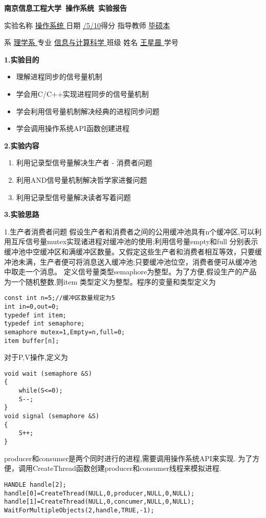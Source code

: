 \documentclass[UTF8,a4paper]{ctexart}
\begin{document}
\pagestyle{plain}
  \centerline{\bfseries{}南京信息工程大学\ 操作系统\ 实验报告}
  \begin{center}
    实验名称 \uline{\enskip 操作系统 \enskip }日期 \uline{/5/10\enskip}得分 \uline{\qquad\qquad}  指导教师 \uline{\enskip 毕硕本 \enskip}
  \end{center}
  \begin{center}
    系 \uline{\enskip 理学系 \enskip} 专业 \uline{\enskip 信息与计算科学 \enskip} 班级 \uline{ \enskip}
    姓名 \uline{\enskip 王星晨 \enskip } 学号 \uline{ \enskip}
  \end{center}
  {\noindent{}\bfseries{1.实验目的}}
\begin{itemize}
\item 理解进程同步的信号量机制
\item 学会用C/C++实现进程同步的信号量机制
\item 学会利用信号量机制解决经典的进程同步问题
\item 学会调用操作系统API函数创建进程
\end{itemize}

 {\noindent{}\bfseries{2.实验内容}}
\begin{enumerate}[label=(\arabic*)]
  \item 利用记录型信号量解决生产者 - 消费者问题
  \item 利用AND信号量机制解决哲学家进餐问题
  \item 利用记录型信号量解决读者写着问题
\end{enumerate}

{\noindent{}\bfseries{3.实验思路}}

1.生产者消费者问题
假设生产者和消费者之间的公用缓冲池具有n个缓冲区,可以利用互斥信号量mutex实现诸进程对缓冲池的使用;利用信号量empty和full 分别表示缓冲池中空缓冲区和满缓冲区数量。又假定这些生产者和消费者相互等效，只要缓冲池未满，生产者便可将消息送入缓冲池;只要缓冲池位空，消费者便可从缓冲池中取走一个消息。
定义信号量类型semaphore为整型。为了方便,假设生产的产品为一个随机整数,则item 类型定义为整型。程序的变量和类型定义为
\begin{lstlisting}
const int n=5;//缓冲区数量规定为5
int in=0,out=0;
typedef int item;
typedef int semaphore;
semaphore mutex=1,Empty=n,full=0;
item buffer[n];
\end{lstlisting}
对于P,V操作,定义为
\begin{lstlisting}
void wait (semaphore &S)
{
	while(S<=0);
	S--;
}
void signal (semaphore &S)
{
	S++;
}
\end{lstlisting}
producer和consumer是两个同时进行的进程,需要调用操作系统API来实现.
为了方便，调用CreateThread函数创建producer和consumer线程来模拟进程.
\begin{lstlisting}
HANDLE handle[2];
handle[0]=CreateThread(NULL,0,producer,NULL,0,NULL);
handle[1]=CreateThread(NULL,0,concumer,NULL,0,NULL);
WaitForMultipleObjects(2,handle,TRUE,-1);
\end{lstlisting}
\end{document}
